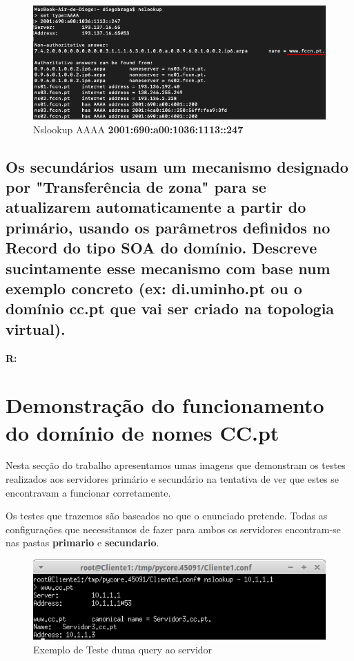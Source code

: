 \documentclass{llncs}
\begin{document}
\begin{figure}[H]
\begin{center}
\includegraphics[scale=0.6]{9.png}
\end{center}
\caption{\label{fig:9}Nslookup AAAA \textbf{2001:690:a00:1036:1113::247}}
\end{figure}


\subsection{\textbf{Os secundários usam um mecanismo designado por "Transferência de zona" para se atualizarem automaticamente a partir do primário, usando os parâmetros definidos no Record do tipo SOA do domínio. Descreve sucintamente esse mecanismo com base num exemplo concreto (ex: di.uminho.pt ou o domínio cc.pt que vai ser criado na topologia virtual).}}
\textbf{R:}


\newpage

\section{Demonstração do funcionamento do domínio de nomes CC.pt}

Nesta secção do trabalho apresentamos umas imagens que demonstram os testes realizados aos servidores primário e secundário na tentativa de ver que estes se encontravam a funcionar corretamente.

Os testes que trazemos são baseados no que o enunciado pretende. Todas as configurações que necessitamos de fazer para ambos os servidores encontram-se nas pastas \textbf{primario} e \textbf{secundario}.

\begin{figure}[H]
\begin{center}
\includegraphics[scale=0.75]{teste1.png}
\end{center}
\caption{\label{fig:t1}Exemplo de Teste duma query ao servidor}
\end{figure}
\end{document}
